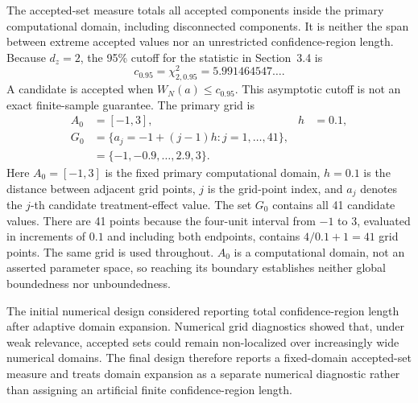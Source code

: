 The accepted-set measure totals all accepted components inside the primary computational domain, including disconnected components. It is neither the span between extreme accepted values nor an unrestricted confidence-region length. Because $d_z=2$, the 95\% cutoff for the statistic in Section~3.4 is
\begin{equation}
  c_{0.95}=\chi^2_{2,0.95}=5.991464547\ldots.
  \label{eq:wn-critical-value}
\end{equation}
A candidate is accepted when $W_N(a)\leq c_{0.95}$. This asymptotic cutoff is not an exact finite-sample guarantee. The primary grid is
\begin{equation}
  \begin{aligned}
    A_0&=[-1,3],
    &h&=0.1,\\
    G_0&=\{a_j=-1+(j-1)h:j=1,\ldots,41\},\\
       &=\{-1,-0.9,\ldots,2.9,3\}.
  \end{aligned}
  \label{eq:primary-grid}
\end{equation}
Here $A_0=[-1,3]$ is the fixed primary computational domain, $h=0.1$ is the distance between adjacent grid points, $j$ is the grid-point index, and $a_j$ denotes the $j$-th candidate treatment-effect value. The set $G_0$ contains all 41 candidate values. There are 41 points because the four-unit interval from $-1$ to $3$, evaluated in increments of $0.1$ and including both endpoints, contains $4/0.1+1=41$ grid points. The same grid is used throughout. $A_0$ is a computational domain, not an asserted parameter space, so reaching its boundary establishes neither global boundedness nor unboundedness.

The initial numerical design considered reporting total confidence-region length after adaptive domain expansion. Numerical grid diagnostics showed that, under weak relevance, accepted sets could remain non-localized over increasingly wide numerical domains. The final design therefore reports a fixed-domain accepted-set measure and treats domain expansion as a separate numerical diagnostic rather than assigning an artificial finite confidence-region length.

